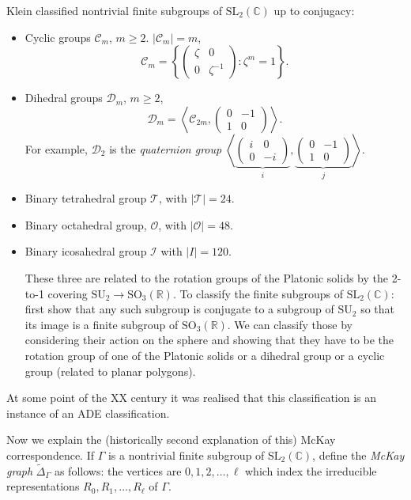 \noindent
Klein classified nontrivial finite subgroups of $\text{SL}_2(\mathbb{C})$ 
up to conjugacy:
\begin{itemize}
\item Cyclic groups $\mathcal{C}_m$, $m \geq 2$. $|\mathcal{C}_m|=m$,
$$
\mathcal{C}_m=\left\{\begin{pmatrix}
\zeta&0\\ 
0&\zeta^{-1}\end{pmatrix}:\zeta^m=1
\right\}.
$$
\item Dihedral groups $\mathcal{D}_m$, $m\geq 2$,
$$
\mathcal{D}_m=\left<\mathcal{C}_{2m},\begin{pmatrix}
0&-1\\ 
1&0
\end{pmatrix}\right>.
$$
For example, $\mathcal{D}_2$ is the {\it quaternion group} 
$\left<\underbrace{\begin{pmatrix}
i&0\\ 
0&-i
\end{pmatrix}}_{i},\underbrace{\begin{pmatrix}
0&-1\\ 
1&0
\end{pmatrix}}_{j}\right>$.

\item Binary tetrahedral group $\mathcal{T}$, with $|\mathcal{T}|=24$.
\item Binary octahedral group, $\mathcal{O}$, with $|\mathcal{O}|=48$.
\item Binary icosahedral group $\mathcal{I}$ with $|I|=120$.

These three are related to the rotation groups of the
Platonic solids by the 2-to-1 covering
$\text{SU}_2 \to \text{SO}_3(\mathbb{R})$.
To classify the finite subgroups of $\text{SL}_2(\mathbb{C})$:
first show that any such subgroup is conjugate to a subgroup
of $\text{SU}_2$ so that its image is a finite subgroup of
$\text{SO}_3(\mathbb{R})$. We can classify those by considering their
action on the sphere and showing that they have to be the
rotation group of one of the Platonic solids or a dihedral group
or a cyclic group (related to planar polygons).
\end{itemize}

\noindent
At some point of the XX century it was realised that this
classification is an instance of an ADE classification.

Now we explain the (historically second explanation of this) McKay
correspondence.
If $\Gamma$ is a nontrivial finite subgroup of $\text{SL}_2(\mathbb{C})$,
define the  {\it McKay graph} $\tilde{\Delta}_\Gamma$ as follows:
the vertices are $0,1,2,\ldots,\ell$ which index the
irreducible representations $R_0,R_1,\ldots,R_\ell$ of $\Gamma$.

